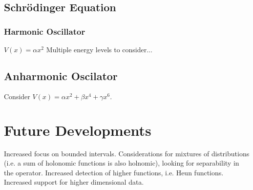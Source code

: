 \documentclass{article}
\begin{document}
\subsection{Schr\"odinger Equation}

\subsubsection{Harmonic Oscillator}
$V(x) = \alpha x^2$
Multiple energy levels to consider...

\subsection{Anharmonic Oscilator}
Consider $V(x) = \alpha x^2 + \beta x^4 + \gamma x^6$.


\section{Future Developments}
Increased focus on bounded intervals.
Considerations for mixtures of distributions (i.e. a sum of holonomic functions is also holnomic), looking for separability in the operator.
Increased detection of higher functions, i.e. Heun functions.
Increased support for higher dimensional data.


{}

\end{document}
